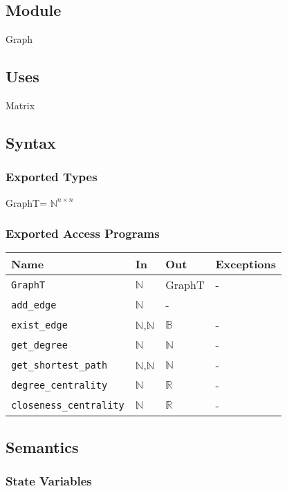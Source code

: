 \documentclass[12pt, titlepage]{article}
\begin{document}
\subsection{Module}
Graph

\subsection{Uses}
Matrix
\subsection{Syntax}

\subsubsection{Exported Types}
GraphT= ${\mathbb{N}}^ {n\times n}$
\subsubsection{Exported Access Programs}
\begin{center}
\begin{tabular}{p{6cm} p{4cm} p{4cm} p{2cm}}
\hline
\textbf{Name} & \textbf{In} & \textbf{Out} & \textbf{Exceptions} \\
\hline
\texttt{GraphT} & ${\mathbb{N}}$  & GraphT& - \\
\texttt{add\_edge} & $\mathbb{N}$&-  \\
\texttt{exist\_edge} & $\mathbb{N}$,$\mathbb{N}$ & $\mathbb{B}$  & - \\
\texttt{get\_degree} & $\mathbb{N}$ & $\mathbb{N}$ & - \\
\texttt{get\_shortest\_path} & $\mathbb{N}$,$\mathbb{N}$ & $\mathbb{N}$ & - \\
\texttt{degree\_centrality} & $\mathbb{N}$ & $\mathbb{R}$ & - \\
\texttt{closeness\_centrality} & $\mathbb{N}$ & $\mathbb{R}$ & - \\

\hline
\end{tabular}
\end{center}

\subsection{Semantics}

\subsubsection{State Variables}
\end{document}
